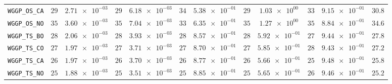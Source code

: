 \begin{table}[H]
\begin{tabularx}{\textwidth}{l||cC|cC|cC|cC|cC||c}
		\texttt{WGGP\_OS\_CA} & $ 29$ & $ \num{2.71e-03}$ & $ 29$ & $ \num{6.18e-03}$ & $ 34$ & $ \num{5.38e-01}$ & $ 29$ & $ \num{1.03e+00}$ & $ 33$ & $ \num{9.15e-01}$ & $ 30.8$  \\
		\texttt{WGGP\_OS\_NO} & $ 35$ & $ \num{3.60e-03}$ & $ 35$ & $ \num{7.04e-03}$ & $ 33$ & $ \num{6.35e-01}$ & $ 35$ & $ \num{1.27e+00}$ & $ 35$ & $ \num{8.84e-01}$ & $ 34.6$  \\
		\texttt{WGGP\_TS\_BO} & $ 28$ & $ \num{2.06e-03}$ & $ 28$ & $ \num{3.93e-03}$ & $ 28$ & $ \num{8.57e-01}$ & $ 28$ & $ \num{5.92e-01}$ & $ 27$ & $ \num{9.44e-01}$ & $ 27.8$  \\
		\texttt{WGGP\_TS\_CO} & $ 27$ & $ \num{1.97e-03}$ & $ 27$ & $ \num{3.71e-03}$ & $ 27$ & $ \num{8.70e-01}$ & $ 27$ & $ \num{5.85e-01}$ & $ 28$ & $ \num{9.43e-01}$ & $ 27.2$  \\
		\texttt{WGGP\_TS\_CA} & $ 26$ & $ \num{1.97e-03}$ & $ 26$ & $ \num{3.70e-03}$ & $ 26$ & $ \num{8.77e-01}$ & $ 26$ & $ \num{5.66e-01}$ & $ 25$ & $ \num{9.48e-01}$ & $ 25.8$  \\
		\texttt{WGGP\_TS\_NO} & $ 25$ & $ \num{1.88e-03}$ & $ 25$ & $ \num{3.51e-03}$ & $ 25$ & $ \num{8.85e-01}$ & $ 25$ & $ \num{5.65e-01}$ & $ 26$ & $ \num{9.46e-01}$ & $ 25.2$  \\
	\end{tabularx}
\end{table}
